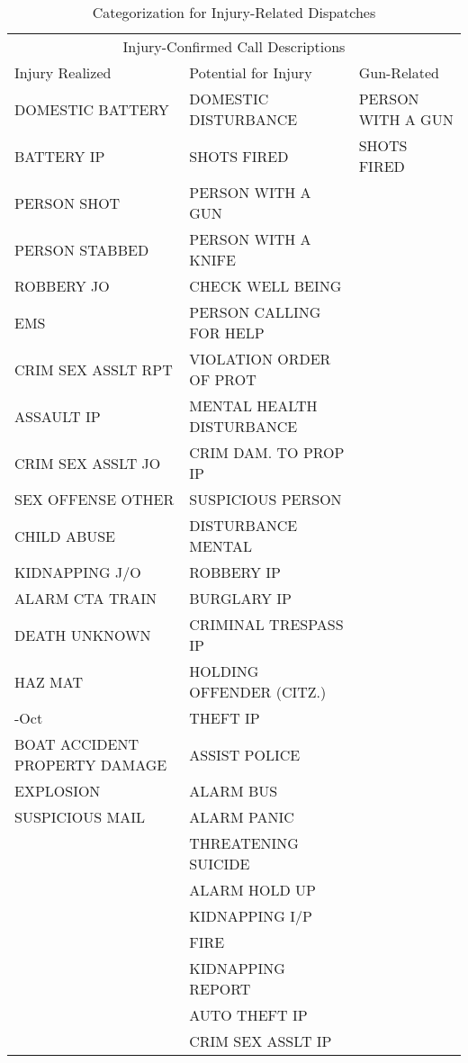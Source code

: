 \begin{table}[H]

\caption{\label{injury_descriptions}Categorization for Injury-Related Dispatches}
\centering
\begin{threeparttable}
\fontsize{9}{11}\selectfont
\begin{tabular}[t]{lll}
\toprule
\multicolumn{3}{c}{Injury-Confirmed Call Descriptions} \\
\cmidrule(l{3pt}r{3pt}){1-3}
Injury Realized & Potential for Injury & Gun-Related\\
\midrule
DOMESTIC BATTERY & DOMESTIC DISTURBANCE & PERSON WITH A GUN\\
BATTERY IP & SHOTS FIRED & SHOTS FIRED\\
PERSON SHOT & PERSON WITH A GUN & \\
PERSON STABBED & PERSON WITH A KNIFE & \\
ROBBERY JO & CHECK WELL BEING & \\
\addlinespace
EMS & PERSON CALLING FOR HELP & \\
CRIM SEX ASSLT RPT & VIOLATION ORDER OF PROT & \\
ASSAULT IP & MENTAL HEALTH DISTURBANCE & \\
CRIM SEX ASSLT JO & CRIM DAM. TO PROP IP & \\
SEX OFFENSE OTHER & SUSPICIOUS PERSON & \\
\addlinespace
CHILD ABUSE & DISTURBANCE MENTAL & \\
KIDNAPPING J/O & ROBBERY IP & \\
ALARM CTA TRAIN & BURGLARY IP & \\
DEATH UNKNOWN & CRIMINAL TRESPASS IP & \\
HAZ MAT & HOLDING OFFENDER (CITZ.) & \\
\addlinespace
1-Oct & THEFT IP & \\
BOAT ACCIDENT PROPERTY DAMAGE & ASSIST POLICE & \\
EXPLOSION & ALARM BUS & \\
SUSPICIOUS MAIL & ALARM PANIC & \\
 & THREATENING SUICIDE & \\
\addlinespace
 & ALARM HOLD UP & \\
 & KIDNAPPING I/P & \\
 & FIRE & \\
 & KIDNAPPING REPORT & \\
 & AUTO THEFT IP & \\
\addlinespace
 & CRIM SEX ASSLT IP & \\

\end{tabular}
\end{threeparttable}
\end{table}
